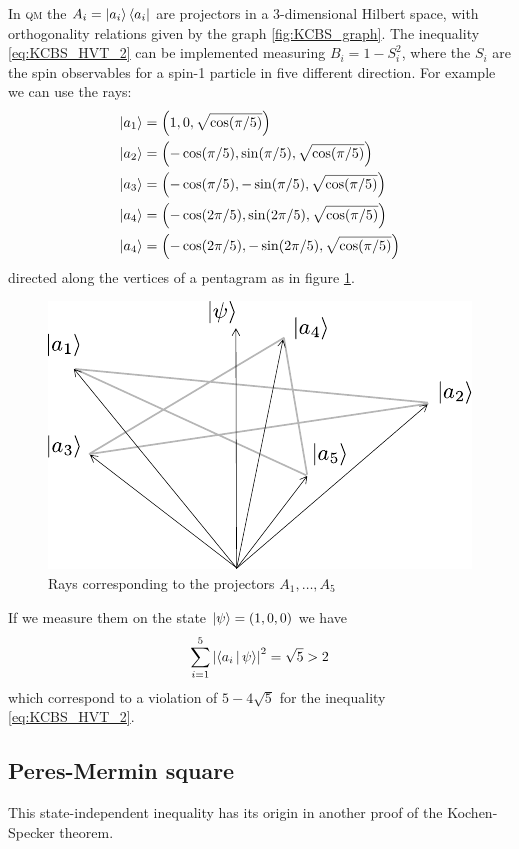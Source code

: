 \documentclass[a4paper]{article}
\newcommand{\acron}[1]{\textsc{#1}}
\newcommand{\QM}{\acron{qm}}
\theoremstyle{definition}
\begin{document}
In \QM{} the $A_i = \Ket{a_i}\Bra{a_i}$ are projectors in a 3-dimensional
Hilbert space, with orthogonality relations given by the graph
\ref{fig:KCBS_graph}.
The inequality \eqref{eq:KCBS_HVT_2} can be implemented measuring $B_i = 1 -
S_i^2$, where the $S_i$ are the spin observables for a spin-1 particle in five
different direction.
For example we can use the rays:
\begin{align}
    \Ket{a_1} &= \left(1,0,\sqrt{\cos(\pi/5)}\right) \\
    \Ket{a_2} &= \left(-\cos(\pi/5),\sin(\pi/5),\sqrt{\cos(\pi/5)}\right)\\ 
    \Ket{a_3} &=\left(-\cos(\pi/5),-\sin(\pi/5),\sqrt{\cos(\pi/5)}\right)\\
    \Ket{a_4} &= \left(-\cos(2\pi/5),\sin(2\pi/5),\sqrt{\cos(\pi/5)}\right)\\
    \Ket{a_4} &=\left(-\cos(2\pi/5),-\sin(2\pi/5),\sqrt{\cos(\pi/5)}\right)\\
    \label{eq:KCBS_rays}
\end{align}
directed along the vertices of a pentagram as in figure \ref{fig:KCBS_pent}.
\begin{figure}[h]
    \centering
    \includegraphics[width=.7\textwidth]{KCBS_pent.pdf}
    \caption{Rays corresponding to the projectors $A_1,\ldots,A_5$ }
    \label{fig:KCBS_pent}
\end{figure}
If we measure them on the state $\Ket{\psi} = (1,0,0)$ we have
\begin{equation}
    \sum_{i=1}^5 \left|\Braket{a_i|\psi}\right|^2 = \sqrt{5} > 2
    \label{eq:KCBS_QM_1}
\end{equation}
which correspond to a violation of $5-4\sqrt{5}$ for the inequality
\eqref{eq:KCBS_HVT_2}.
\subsection{Peres-Mermin square}
\label{sec:PM_square}
This state-independent inequality has its origin in another proof of the
Kochen-Specker theorem.
\end{document}
